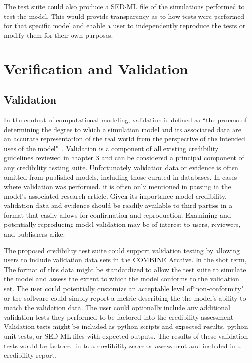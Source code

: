 \documentclass[12pt]{report}
\begin{document}
The test suite could also produce a SED-ML file of the simulations performed to test the model. This would provide transparency as to how tests were performed for that specific model and enable a user to independently reproduce the tests or modify them for their own purposes.


\chapter{Verification and Validation}
\section{Validation}
In the context of computational modeling, validation is defined as ``the process of determining the degree to which a simulation model and its associated data are an accurate representation of the real world from the perspective of the intended uses of the model"~\cite{Thacker2004}. Validation is a component of all existing credibility guidelines reviewed in chapter 3 and can be considered a principal component of any credibility testing suite. Unfortunately validation data or evidence is often omitted from published models, including those curated in databases. In cases where validation was performed, it is often only mentioned in passing in the model's associated research article.  Given its importance model credibility, validation data and evidence should be readily available to third parties in a format that easily allows for confirmation and reproduction. Examining and potentially reproducing model validation may be of interest to users, reviewers, and publishers alike. 

The proposed credibility test suite could support validation testing by allowing users to include validation data sets in the COMBINE Archive. In the shot term, The format of this data might be standardized to allow the test suite to simulate the model and assess the extent to which the model conforms to the validation set. The user could potentially customize an acceptable level of``non-conformity" or the software could simply report a metric describing the the model's ability to match the validation data. The user could optionally include any additional validation tests they performed to be factored into the credibility assessment. Validation tests might be included as python scripts and expected results, python unit tests, or SED-ML files with expected outputs.  The results of these validation tests would be factored in to a credibility score or assessment and included in a credibility report. 
\end{document}
